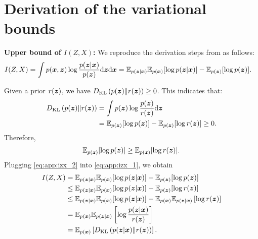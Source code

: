 \section{Derivation of the variational bounds} \label{sec:app:derivation_of_bounds}

\textbf{Upper bound of $I(Z, X)$:} We reproduce the derivation steps from \citet{alemi2017deep} as follows:
\begin{equation}
    \begin{aligned}
         I(Z, X) &= \int p(\bm{x}, \bm{z}) \log \frac{p(\bm{z} | \bm{x})}{p(\bm{z})} \mathrm{d} \bm{z} \mathrm{d} \bm{x} = \mathbb{E}_{p(\bm{z}| \bm{x})} \mathbb{E}_{p(\bm{x})} [\log p(\bm{z} | \bm{x})] - \mathbb{E}_{p(\bm{z})}[\log p(\bm{z})].
    \end{aligned}
    \label{eq:app:izx_1}
\end{equation}

Given a prior $r(\bm{z})$, we have $D_{\text{KL}}\left(p(\bm{z}) \| r(\bm{z}) \right) \geq 0$. This indicates that:
\begin{equation*}
    \begin{aligned}
        D_{\text{KL}}\left(p(\bm{z}) \| r(\bm{z}) \right) &= \int p(\bm{z}) \log \frac{p(\bm{z})}{r(\bm{z})} \mathrm{d} \bm{z} \\
        &= \mathbb{E}_{p(\bm{z})} [\log p(\bm{z})] - \mathbb{E}_{p(\bm{z})} [\log r(\bm{z})] \geq 0. \\
    \end{aligned}
\end{equation*}
Therefore, 
\begin{equation}
    \begin{aligned}
        \mathbb{E}_{p(\bm{z})} [\log p(\bm{z})] \geq \mathbb{E}_{p(\bm{z})} [\log r(\bm{z})].
    \end{aligned}
    \label{eq:app:izx_2}
\end{equation}
Plugging \cref{eq:app:izx_2} into \cref{eq:app:izx_1}, we obtain
\begin{equation}
    \begin{aligned}
        I(Z, X) &= \mathbb{E}_{p(\bm{z}| \bm{x})} \mathbb{E}_{p(\bm{x})} [\log p(\bm{z} | \bm{x})] - \mathbb{E}_{p(\bm{z})}[\log p(\bm{z})] \\
        &\leq \mathbb{E}_{p(\bm{z}| \bm{x})} \mathbb{E}_{p(\bm{x})} [\log p(\bm{z} | \bm{x})] - \mathbb{E}_{p(\bm{z})}[\log r(\bm{z})] \\
        &\leq \mathbb{E}_{p(\bm{z}| \bm{x})} \mathbb{E}_{p(\bm{x})} [\log p(\bm{z} | \bm{x})] - \mathbb{E}_{p(\bm{x})} \mathbb{E}_{p(\bm{z} |\bm{x})} \left[ \log r(\bm{z})\right] \\
        &= \mathbb{E}_{p(\bm{x})} \mathbb{E}_{p(\bm{z} | \bm{x})} \left[ \log \frac{p(\bm{z} | \bm{x})}{r(\bm{z})} \right] \\
        &= \mathbb{E}_{p(\bm{x})} \left[ D_{\text{KL}}\left(p(\bm{z} | \bm{x}) \| r(\bm{z}) \right) \right].
    \end{aligned}
    \label{eq:app:izx_3}
\end{equation}




